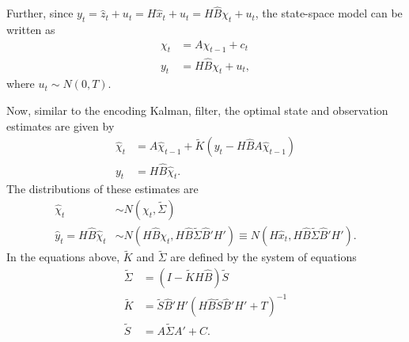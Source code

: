 \documentclass{article}
\begin{document}
Further, since $y_t = \hat{z}_t + u_t = H\hat{x}_t + u_t = H \hat{B} \chi_t + u_t$, the state-space model can be written as
\begin{subequations}
\begin{align}
	\chi_t &= A \chi_{t-1} + c_t \\
	y_t &= H \hat{B} \chi_t + u_t,
\end{align}
\end{subequations}
where $u_t\sim N(0, T)$.

Now, similar to the encoding Kalman, filter, the optimal state and observation estimates are given by
\begin{subequations}
\begin{align}
	\hat{\chi}_t &= A \hat{\chi}_{t-1} + \tilde{K} (y_t - H \hat{B} A \hat{\chi}_{t-1}) \\
	y_t &= H\hat{B} \hat{\chi}_t.
\end{align}
\end{subequations}
The distributions of these estimates are
\begin{subequations}
\begin{align}
	\hat{\chi}_t &\sim N(\chi_t, \tilde{\Sigma}) \\
	\hat{y}_t = H \hat{B} \hat{\chi}_t &\sim N(H \hat{B} \chi_t, H \hat{B} \tilde{\Sigma} \hat{B}' H') \equiv N(H \hat{x}_t, H \hat{B} \tilde{\Sigma} \hat{B}' H').
\end{align}
\end{subequations}
In the equations above, $\tilde{K}$ and $\tilde{\Sigma}$ are defined by the system of equations
\begin{subequations}
	\begin{align}
	\tilde{\Sigma} &= (I - \tilde{K} H \hat{B}) \tilde{S} \\
	\tilde{K} &= \tilde{S} \hat{B}' H' (H \hat{B} \tilde{S} \hat{B}' H' + T)^{-1} \\
	\tilde{S} &= A \tilde{\Sigma} A' + C.
	\end{align}
\end{subequations}
\end{document}
